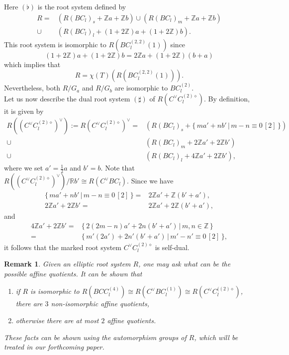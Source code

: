 \documentclass[11pt]{amsart}
\newcommand{\R}{\mathbb{R}}
\newcommand{\Z}{\mathbb{Z}}
\newtheorem{rem}[thm]{Remark}%
\begin{document}
\vskip 0.2in


Here $(\flat)$ is the root system defined by
\begin{align*}
R=
&(R(BC_l)_s+\Z a+\Z b) 
\cup 
(R(BC_l)_m+\Z a+\Z b) \\
\cup
&(R(BC_l)_l+(1+2\Z)a+(1+2\Z)b).
\end{align*}
This root system is isomorphic to $R(BC_l^{(2,2)}(1))$ since
\[
 (1+2\Z)a+(1+2\Z)b 
=
2\Z a+(1+2\Z)(b+a) 
\]
which implies that 
\[ R=\chi(T)(R(BC_l^{(2,2)}(1))). \]
Nevertheless, both $R/G_a$ and $R/G_b$ are isomorphic to $BC_l^{(2)}$. \\

Let us now describe the dual root system $(\sharp)$ of $R(C^\vee C_l^{(2)\diamond})$. By definition, it is given by
\begin{align*}
R((C^\vee C_l^{(2)\diamond})^\vee):=R(C^\vee C_l^{(2)\diamond})^\vee=
&(R(BC_l)_s+\{\, ma'+nb'\, \vert\, m-n\equiv 0\, [2]\, \}) \\
\cup
&(R(BC_l)_m+2\Z a'+2\Z b') \\
\cup 
&(R(BC_l)_l+4\Z a'+2\Z b'),
\end{align*}
where we set $a'=\frac{1}{2}a$ and $b'=b$. Note that $R((C^\vee C_l^{(2)\diamond})^\vee)/\R b' \cong R(C^\vee BC_l)$. 
Since we have
\begin{align*}
\{\, ma'+nb'\, \vert\, m-n\equiv 0\, [2]\, \}=
&2\Z a'+\Z (b'+a'), \\
2\Z a'+2\Z b'=
&2\Z a'+2\Z (b'+a'), 
\end{align*}
and
\begin{align*}
4\Z a'+2\Z b'=
&\{ \, 2(2m-n)a'+2n(b'+a')\, \vert\, m,n \in \Z\, \} \\
=
&\{ \, m' (2a')+2n'(b'+a')\, \vert\, m'-n'\equiv 0\, [2]\, \},
\end{align*}
it follows that the marked root system $C^\vee C_l^{(2)\diamond}$ is self-dual. \\

\begin{rem} Given an elliptic root system $R$, one may ask what can be the possible affine quotients. 
It  can be shown that 
\begin{enumerate}
\item if $R$ is isomorphic to $R(BCC_l^{(4)}) \cong R(C^\vee BC_l^{(1)}) \cong R(C^\vee C_l^{((2) \diamond})$, there are $3$ non-isomorphic affine quotients, 
\item otherwise there are at most $2$ affine quotients.
\end{enumerate}
These facts can be shown using the automorphism groups of $R$, which will be treated in our forthcoming paper. 
\end{rem}
\end{document}
